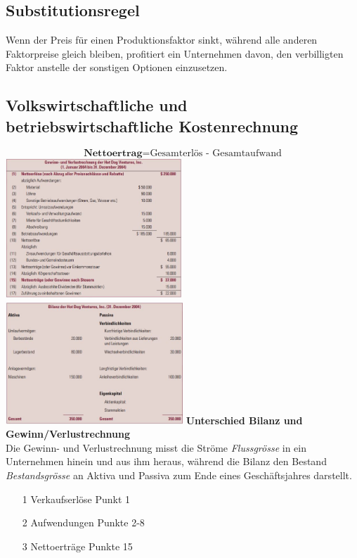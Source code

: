 \documentclass[10pt]{scrartcl}
\begin{document}
\subsection{Substitutionsregel}
Wenn der Preis für einen Produktionsfaktor sinkt, während alle anderen Faktorpreise gleich bleiben, profitiert ein Unternehmen davon, den verbilligten Faktor anstelle der sonstigen Optionen einzusetzen.


\subsection{Volkswirtschaftliche und betriebswirtschaftliche Kostenrechnung}
\begin{equation}
\textbf{Nettoertrag} = \text{Gesamterlös - Gesamtaufwand} \nonumber
\end{equation}
\includegraphics[width=0.5\textwidth]{img/kostenrechnung.jpg}
\includegraphics[width=0.5\textwidth]{img/bilanz.jpg}
{\bf Unterschied Bilanz und Gewinn/Verlustrechnung}\\
Die Gewinn- und Verlustrechnung misst die Ströme {\it Flussgrösse} in ein Unternehmen hinein und aus ihm heraus, während die Bilanz den Bestand {\it Bestandsgrösse}  an Aktiva und Passiva zum Ende eines Geschäftsjahres darstellt.
\begin{itemize}
\item[1] Verkaufserlöse {Punkt 1}
\item[2] Aufwendungen {Punkte 2-8}
\item[3] Nettoerträge {Punkte 15}
\end{itemize}
\end{document}
